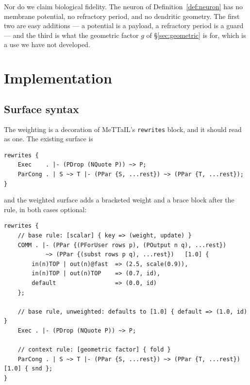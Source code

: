 \documentclass[11pt,a4paper]{article}
\theoremstyle{plain}
\theoremstyle{definition}
\theoremstyle{remark}
\newcommand{\gfac}{g}
\begin{document}
Nor do we claim biological fidelity. The neuron of Definition~\ref{def:neuron} has no membrane
potential, no refractory period, and no dendritic geometry. The first two are easy additions --- a
potential is a payload, a refractory period is a guard --- and the third is what the geometric factor
$\gfac$ of \S\ref{sec:geometric} is for, which is a use we have not developed.

\section{Implementation}
\label{sec:impl}

\subsection{Surface syntax}
\label{sec:surface}

The weighting is a decoration of MeTTaIL's \texttt{rewrites} block, and it should read as one. The
existing surface is
\begin{center}
\begin{minipage}{0.88\textwidth}
\begin{lstlisting}
rewrites {
    Exec    . |- (PDrop (NQuote P)) ~> P;
    ParCong . | S ~> T |- (PPar {S, ...rest}) ~> (PPar {T, ...rest});
}
\end{lstlisting}
\end{minipage}
\end{center}
and the weighted surface adds a bracketed weight and a brace block after the rule, in both cases
optional:
\begin{center}
\begin{minipage}{0.88\textwidth}
\begin{lstlisting}
rewrites {
    // base rule: [scalar] { key => (weight, update) }
    COMM . |- (PPar {(PForUser rows p), (POutput n q), ...rest})
            ~> (PPar {(subst rows p q), ...rest})   [1.0] {
        in(n)TOP | out(n)@fast  => (2.5, scale(0.9)),
        in(n)TOP | out(n)TOP    => (0.7, id),
        default                 => (0.0, id)
    };

    // base rule, unweighted: defaults to [1.0] { default => (1.0, id) }
    Exec . |- (PDrop (NQuote P)) ~> P;

    // context rule: [geometric factor] { fold }
    ParCong . | S ~> T |- (PPar {S, ...rest}) ~> (PPar {T, ...rest})  [1.0] { snd };
}
\end{lstlisting}
\end{minipage}
\end{center}
\end{document}

